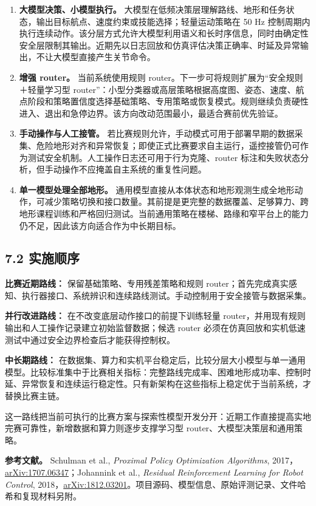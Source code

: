 \documentclass[
  11pt,
  a4paper,
]{article}
\providecommand{\tightlist}{%
  \setlength{\itemsep}{0pt}\setlength{\parskip}{0pt}}
\begin{document}
\begin{enumerate}
\def\labelenumi{\arabic{enumi}.}
\tightlist
\item
  \textbf{大模型决策、小模型执行。}
  大模型在低频决策层理解路线、地形和任务状态，输出目标航点、速度约束或技能选择；轻量运动策略在
  50 Hz
  控制周期内执行连续动作。该分层方式允许大模型利用语义和长时序信息，同时由确定性安全层限制其输出。近期先以日志回放和仿真评估决策正确率、时延及异常输出，不让大模型直接产生关节命令。
\item
  \textbf{增强 router。} 当前系统使用规则
  router。下一步可将规则扩展为``安全规则＋轻量学习型
  router''：小型分类器或高层策略根据高度图、姿态、速度、航点阶段和策略置信度选择基础策略、专用策略或恢复模式。规则继续负责硬性进入、退出和急停边界。该方向改动范围最小，最适合赛前优先验证。
\item
  \textbf{手动操作与人工接管。}
  若比赛规则允许，手动模式可用于部署早期的数据采集、危险地形对齐和异常恢复；即使正式比赛要求自主运行，遥控接管仍可作为测试安全机制。人工操作日志还可用于行为克隆、router
  标注和失败状态分析，但手动操作不应掩盖自主系统的重复性问题。
\item
  \textbf{单一模型处理全部地形。}
  通用模型直接从本体状态和地形观测生成全地形动作，可减少策略切换和接口数量。其前提是更完整的数据覆盖、足够算力、跨地形课程训练和严格回归测试。当前通用策略在楼梯、路缘和窄平台上的能力仍不足，因此该方向适合作为中长期目标。
\end{enumerate}

\subsection{7.2 实施顺序}\label{ux5b9eux65bdux987aux5e8f}

\textbf{比赛近期路线：} 保留基础策略、专用残差策略和规则
router；首先完成真实感知、执行器接口、系统辨识和连续路线测试。手动控制用于安全接管与数据采集。

\textbf{并行改进路线：} 在不改变底层动作接口的前提下训练轻量
router，并用现有规则输出和人工操作记录建立初始监督数据；候选 router
必须在仿真回放和实机低速测试中通过安全边界检查后才能获得控制权。

\textbf{中长期路线：}
在数据集、算力和实机平台稳定后，比较分层大小模型与单一通用模型。比较标准集中于比赛相关指标：完整路线完成率、困难地形成功率、控制时延、异常恢复和连续运行稳定性。只有新架构在这些指标上稳定优于当前系统，才替换比赛主链。

这一路线把当前可执行的比赛方案与探索性模型开发分开：近期工作直接提高实地完赛可靠性，新增数据和算力则逐步支撑学习型
router、大模型决策层和通用策略。

\textbf{参考文献。} Schulman et al., \emph{Proximal Policy Optimization
Algorithms},
2017，\href{https://arxiv.org/abs/1707.06347}{arXiv:1707.06347}；Johannink
et al., \emph{Residual Reinforcement Learning for Robot Control},
2018，\href{https://arxiv.org/abs/1812.03201}{arXiv:1812.03201}。项目源码、模型信息、原始评测记录、文件哈希和复现材料另附。
\end{document}
